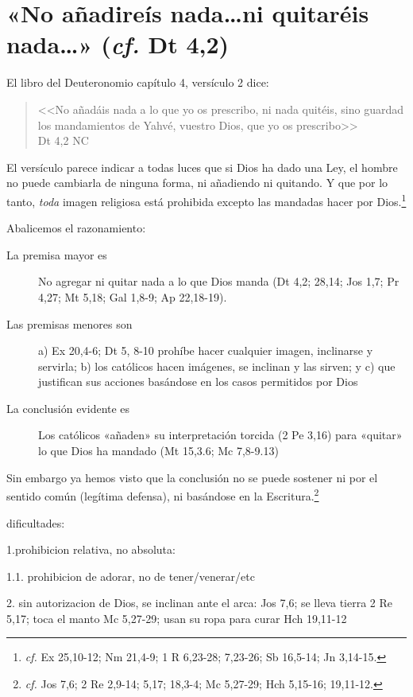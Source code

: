 \documentclass{article}
\begin{document}
\section{«No añadireís nada\ldots ni quitaréis nada\ldots» (\emph{cf.} Dt 4,2)}

El libro del Deuteronomio capítulo 4, versículo 2 dice:

\begin{quote}
<<No a\~nad\'ais nada a lo que yo os prescribo, ni nada quit\'eis, sino guardad los mandamientos de Yahv\'e, vuestro Dios, que yo os prescribo>>\\
Dt 4,2 NC
\end{quote}

\noindent
El versículo parece indicar a todas luces que si Dios ha dado una Ley, el hombre no puede cambiarla de ninguna forma, ni añadiendo ni quitando. Y que por lo tanto, \emph{toda} imagen religiosa está prohibida excepto las mandadas hacer por Dios.\footnote{\emph{cf.} Ex 25,10-12; Nm 21,4-9; 1 R 6,23-28; 7,23-26; Sb 16,5-14; Jn 3,14-15.}

Abalicemos el razonamiento:

\begin{description}
\item[La premisa mayor es] No agregar ni quitar nada a lo que Dios manda (Dt 4,2; 28,14; Jos 1,7; Pr 4,27; Mt 5,18; Gal 1,8-9; Ap 22,18-19).
\item[Las premisas menores son] a) Ex 20,4-6; Dt 5, 8-10 prohíbe hacer cualquier imagen, inclinarse y servirla; b) los católicos hacen imágenes, se inclinan y las sirven; y c) que justifican sus acciones basándose en los casos permitidos por Dios
\item[La conclusión evidente es] Los católicos «añaden» su interpretación torcida (2 Pe 3,16) para «quitar» lo que Dios ha mandado (Mt 15,3.6; Mc 7,8-9.13)
\end{description}

\noindent
Sin embargo ya hemos visto que la conclusión no se puede sostener ni por el sentido común (legítima defensa), ni basándose en la Escritura.\footnote{\emph{cf.} Jos 7,6;  2 Re 2,9-14; 5,17; 18,3-4; Mc 5,27-29; Hch 5,15-16; 19,11-12.}

dificultades:

1.prohibicion relativa, no absoluta:

1.1. prohibicion de adorar, no de tener/venerar/etc

2. sin autorizacion de Dios, se inclinan ante el arca: Jos 7,6; se lleva tierra 2 Re 5,17; toca el manto Mc 5,27-29; usan su ropa para curar Hch 19,11-12
\end{document}
